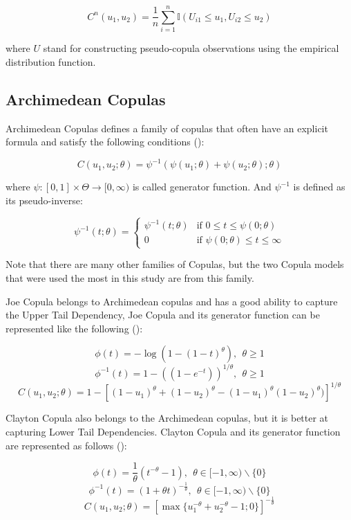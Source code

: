 \documentclass[
]{krantz}
\begin{document}
\[C^n(u_1, u_2) = \frac{1}{n} \sum_{i=1}^n \mathbb{I}\left(U_{i1} \leq u_1, U_{i2} \leq u_2\right) \tag{8} \]

where \(U\) stand for constructing pseudo-copula observations using the empirical distribution function.

\subsection{Archimedean Copulas}\label{archimedean-copulas}

Archimedean Copulas defines a family of copulas that often have an explicit formula and satisfy the following conditions (\citet{mcneil2009}):

\[C(u_{1}, u_{2}; \theta) = \psi^{-1}\left( \psi(u_{1}; \theta) + \psi(u_{2}; \theta); \theta \right) \tag{9}\]

where \(\psi : [0,1] \times \Theta \rightarrow [0,\infty)\) is called generator function. And \(\psi^{-1}\) is defined as its pseudo-inverse:

\[\psi^{-1}(t; \theta) =
\begin{cases}
    \psi^{-1}(t; \theta) & \text{if } 0 \le t \le \psi(0; \theta) \\
    0 & \text{if } \psi(0; \theta) \le t \le \infty
\end{cases} \tag{10}\]

Note that there are many other families of Copulas, but the two Copula models that were used the most in this study are from this family.

Joe Copula belongs to Archimedean copulas and has a good ability to capture the Upper Tail Dependency, Joe Copula and its generator function can be represented like the following (\citet{triantafyllou2024}):

\[\phi(t) = -\log\left(1 - (1 - t)^\theta\right), \ \ \theta \geq 1 \tag{11}\]
\[\phi^{-1}(t) = 1 - ((1 - e^{-t}))^{1/\theta}, \ \ \theta \geq 1 \tag{12}\]
\[C(u_1, u_2; \theta) = 1 - \left[ (1 - u_1)^\theta+(1 - u_2)^\theta - (1 - u_1)^\theta(1 - u_2)^\theta)\right]^{1/\theta} \tag{13}\]

Clayton Copula also belongs to the Archimedean copulas, but it is better at capturing Lower Tail Dependencies. Clayton Copula and its generator function are represented as follows (\citet{chesneau2023}):

\[\phi(t) = \frac{1}{\theta} (t^{-\theta} - 1), \ \ \theta \in [-1, \infty) \backslash \{0\} \tag{14}\]
\[\phi^{-1}(t) = (1 + \theta t)^{-\frac{1}{\theta}}, \ \ \theta \in [-1, \infty) \backslash \{0\} \tag{15}\]
\[C(u_1, u_2; \theta) = \left[\max\{u_1^{-\theta} + u_2^{-\theta} -1;0\}\right]^{-\frac{1}{\theta}} \tag{16}\]
\end{document}
